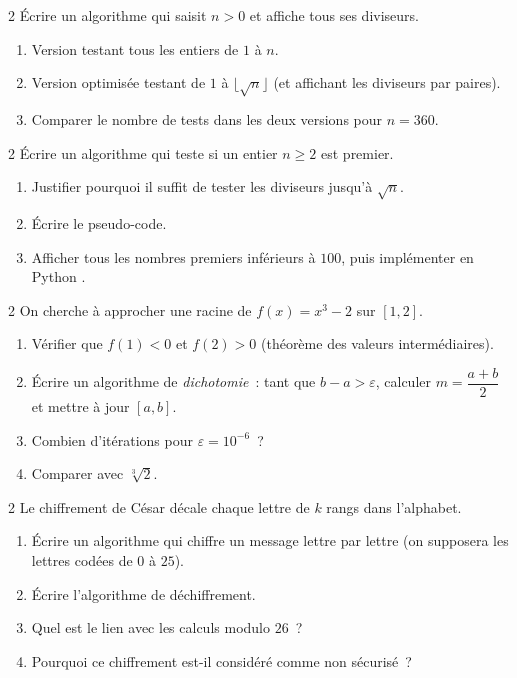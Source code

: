\begin{exo}{2}
\'Ecrire un algorithme qui saisit $n > 0$ et affiche tous ses diviseurs.
\begin{enumerate}
  \item Version testant tous les entiers de $1$ \`a $n$.
  \item Version optimis\'ee testant de $1$ \`a $\lfloor\sqrt{n}\rfloor$
        (et affichant les diviseurs par paires).
  \item Comparer le nombre de tests dans les deux versions pour $n=360$.
\end{enumerate}
\end{exo}

\begin{exo}{2}
\'Ecrire un algorithme qui teste si un entier $n \geq 2$ est premier.
\begin{enumerate}
  \item Justifier pourquoi il suffit de tester les diviseurs jusqu'\`a $\sqrt{n}$.
  \item \'Ecrire le pseudo-code.
  \item Afficher tous les nombres premiers inf\'erieurs \`a $100$,
        puis impl\'ementer en Python \computer.
\end{enumerate}
\end{exo}

\begin{exo}{2}
On cherche \`a approcher une racine de $f(x) = x^3 - 2$ sur $[1, 2]$.
\begin{enumerate}
  \item V\'erifier que $f(1)<0$ et $f(2)>0$ (th\'eor\`eme des valeurs
        interm\'ediaires).
  \item \'Ecrire un algorithme de \emph{dichotomie}~: tant que $b-a > \varepsilon$,
        calculer $m=\dfrac{a+b}{2}$ et mettre \`a jour $[a,b]$.
  \item Combien d'it\'erations pour $\varepsilon = 10^{-6}$~?
  \item Comparer avec $\sqrt[3]{2}$.
\end{enumerate}
\end{exo}

\begin{exo}{2}
Le chiffrement de C\'esar d\'ecale chaque lettre de $k$ rangs dans l'alphabet.
\begin{enumerate}
  \item \'Ecrire un algorithme qui chiffre un message lettre par lettre
        (on supposera les lettres cod\'ees de $0$ \`a $25$).
  \item \'Ecrire l'algorithme de d\'echiffrement.
  \item Quel est le lien avec les calculs modulo $26$~?
  \item Pourquoi ce chiffrement est-il consid\'er\'e comme non s\'ecuris\'e~?
\end{enumerate}
\end{exo}

